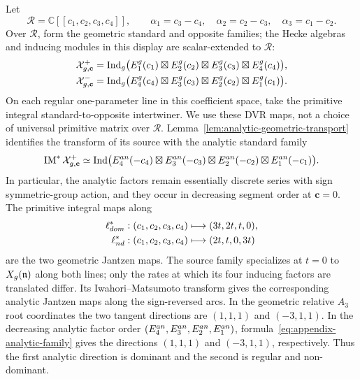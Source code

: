 \documentclass[10pt,a4paper]{amsart}
\begin{document}
Let
\[
 \mathcal R=\mathbb C[[c_1,c_2,c_3,c_4]],\qquad
 \alpha_1=c_3-c_4,\quad \alpha_2=c_2-c_3,\quad
 \alpha_3=c_1-c_2.
\]
Over $\mathcal R$, form the geometric standard and opposite families; the
Hecke algebras and inducing modules in this display are scalar-extended to
$\mathcal R$:
\begin{align*}
 \mathcal X^+_{{\rm g},\mathbf c}
  &=\operatorname{Ind}_{\rm g}
    \bigl(E_1^{\rm g}(c_1)\boxtimes E_2^{\rm g}(c_2)\boxtimes
          E_3^{\rm g}(c_3)\boxtimes E_4^{\rm g}(c_4)\bigr),\\
 \mathcal X^-_{{\rm g},\mathbf c}
  &=\operatorname{Ind}_{\rm g}
    \bigl(E_4^{\rm g}(c_4)\boxtimes E_3^{\rm g}(c_3)\boxtimes
          E_2^{\rm g}(c_2)\boxtimes E_1^{\rm g}(c_1)\bigr).
\end{align*}
On each regular one-parameter line in this coefficient space, take
the primitive integral standard-to-opposite intertwiner.  We use these
DVR maps, not a choice of universal primitive matrix over $\mathcal R$.
Lemma~\ref{lem:analytic-geometric-transport} identifies the transform of
its source with the analytic standard family
\begin{equation}\label{eq:appendix-analytic-family}
 \operatorname{IM}^*\mathcal X^+_{{\rm g},\mathbf c}
 \simeq
 \operatorname{Ind}\bigl(
 E_4^{\rm an}(-c_4)\boxtimes E_3^{\rm an}(-c_3)\boxtimes
 E_2^{\rm an}(-c_2)\boxtimes E_1^{\rm an}(-c_1)\bigr).
\end{equation}
In particular, the analytic factors remain essentially discrete series with
sign symmetric-group action, and they occur in decreasing segment order at
$\mathbf c=0$.
The primitive integral maps along
\begin{align}
 \ell_{\rm dom}^*:(c_1,c_2,c_3,c_4)&\longmapsto(3t,2t,t,0),
 \label{eq:appendix-dominant-line}\\
 \ell_{\rm nd}^*:(c_1,c_2,c_3,c_4)&\longmapsto(2t,t,0,3t)
 \label{eq:appendix-nondominant-line}
\end{align}
are the two geometric Jantzen maps.  The source family specializes at
$t=0$ to $X_{\rm g}(\mathfrak n)$ along both lines; only the rates at which
its four inducing factors are translated differ.  Its Iwahori--Matsumoto
transform gives the corresponding analytic Jantzen maps along the
sign-reversed arcs.  In the geometric relative $A_3$ root coordinates the
two tangent directions are $(1,1,1)$ and $(-3,1,1)$.  In the decreasing
analytic factor order $(E_4^{\rm an},E_3^{\rm an},E_2^{\rm an},E_1^{\rm an})$,
formula~\eqref{eq:appendix-analytic-family} gives the directions
$(1,1,1)$ and $(-3,1,1)$, respectively.  Thus the first analytic direction
is dominant and the second is regular and non-dominant.
\end{document}

